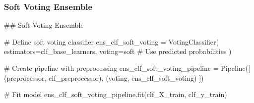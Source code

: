 \documentclass[
  letterpaper,
  DIV=11,
  numbers=noendperiod]{scrreprt}
\newenvironment{Shaded}{\begin{snugshade}}{\end{snugshade}}
\newcommand{\CommentTok}[1]{\textcolor[rgb]{0.37,0.37,0.37}{#1}}
\newcommand{\NormalTok}[1]{\textcolor[rgb]{0.00,0.23,0.31}{#1}}
\newcommand{\OperatorTok}[1]{\textcolor[rgb]{0.37,0.37,0.37}{#1}}
\newcommand{\StringTok}[1]{\textcolor[rgb]{0.13,0.47,0.30}{#1}}
\begin{document}
\subsubsection{Soft Voting Ensemble}\label{soft-voting-ensemble}

\begin{Shaded}
\begin{Highlighting}[]
\CommentTok{\#\# Soft Voting Ensemble}

\CommentTok{\# Define soft voting classifier}
\NormalTok{ens\_clf\_soft\_voting }\OperatorTok{=}\NormalTok{ VotingClassifier(}
\NormalTok{    estimators}\OperatorTok{=}\NormalTok{clf\_base\_learners,}
\NormalTok{    voting}\OperatorTok{=}\StringTok{\textquotesingle{}soft\textquotesingle{}}  \CommentTok{\# Use predicted probabilities}
\NormalTok{)}

\CommentTok{\# Create pipeline with preprocessing}
\NormalTok{ens\_clf\_soft\_voting\_pipeline }\OperatorTok{=}\NormalTok{ Pipeline([}
\NormalTok{    (}\StringTok{\textquotesingle{}preprocessor\textquotesingle{}}\NormalTok{, clf\_preprocessor),}
\NormalTok{    (}\StringTok{\textquotesingle{}voting\textquotesingle{}}\NormalTok{, ens\_clf\_soft\_voting)}
\NormalTok{])}

\CommentTok{\# Fit model}
\NormalTok{ens\_clf\_soft\_voting\_pipeline.fit(clf\_X\_train, clf\_y\_train)}
\end{Highlighting}
\end{Shaded}
\end{document}
